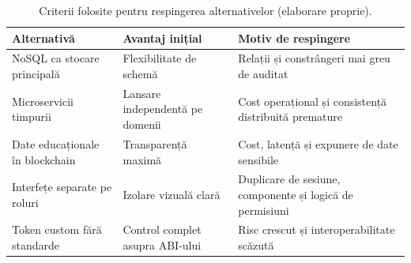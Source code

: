 \begin{table}[H]
    \centering
    \caption{Criterii folosite pentru respingerea alternativelor (elaborare proprie).}
    \label{tab:criterii_respingere}
    \begin{tabular}{P{3.6cm}P{5cm}P{5cm}}
        \toprule
        Alternativă & Avantaj inițial & Motiv de respingere \\
        \midrule
        NoSQL ca stocare principală & Flexibilitate de schemă & Relații și constrângeri mai greu de auditat \\
        Microservicii timpurii & Lansare independentă pe domenii & Cost operațional și consistență distribuită premature \\
        Date educaționale în blockchain & Transparență maximă & Cost, latență și expunere de date sensibile \\
        Interfețe separate pe roluri & Izolare vizuală clară & Duplicare de sesiune, componente și logică de permisiuni \\
        Token custom fără standarde & Control complet asupra ABI-ului & Risc crescut și interoperabilitate scăzută \\
        \bottomrule
    \end{tabular}
\end{table}
